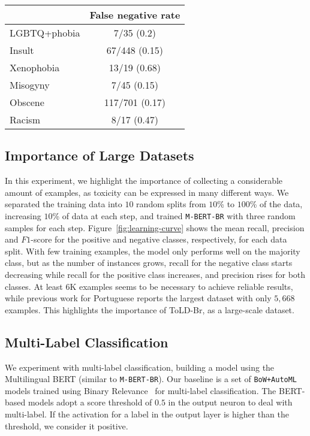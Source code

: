 \documentclass[11pt,a4paper]{article}
\begin{document}
\begin{table}[!ht]
\centering
\begin{tabular}{@{}lc@{}}
\toprule
             & False negative rate \\ \midrule
LGBTQ+phobia & 7/35 (0.2)                                   \\
Insult       & 67/448 (0.15)                                 \\
Xenophobia   & 13/19 (0.68)                                  \\
Misogyny     & 7/45 (0.15)                                   \\
Obscene      & 117/701 (0.17)                                \\
Racism       & 8/17 (0.47)                                   \\ \bottomrule
\end{tabular}
\label{tab:error404}
\end{table}






\subsection{Importance of Large Datasets}
In this experiment, we highlight the importance of collecting a considerable amount of examples, as toxicity can be expressed in many different ways. We separated the training data into $10$ random splits from $10$\% to $100$\% of the data, increasing $10$\% of data at each step, and trained \texttt{M-BERT-BR} with three random samples for each step. Figure~\ref{fig:learning-curve} shows the mean recall, precision and $F1$-score for the positive and negative classes, respectively, for each data split. With few training examples, the model only performs well on the majority class, but as the number of instances grows, recall for the negative class starts decreasing while recall for the positive class increases, and precision rises for both classes. At least $6$K examples seems to be necessary to achieve reliable results, while previous work for Portuguese reports the largest dataset with only $5,668$ examples. This highlights the importance of ToLD-Br, as a large-scale dataset. 


\subsection{Multi-Label Classification}
We experiment with multi-label classification, building a model using the Multilingual BERT (similar to \texttt{M-BERT-BR}). Our baseline is a set of \texttt{BoW+AutoML} models trained using Binary Relevance~\cite{tsoumakas2009mining} for multi-label classification. The BERT-based models adopt a score threshold of $0.5$ in the output neuron to deal with multi-label. If the activation for a label in the output layer is higher than the threshold, we consider it positive.
\end{document}
